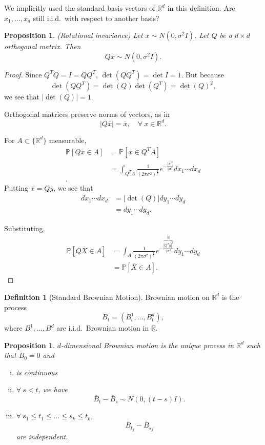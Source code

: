 \documentclass{tufte-handout}
\newcommand*\R{\mathbb{R}}
\renewcommand*\P{\mathbb{P}}
\newtheorem{prop}[thm]{Proposition}
\theoremstyle{definition}
\newtheorem{defn}[thm]{Definition}
\begin{document}
We implicitly used the standard basis vectors of $\R^d$ in this definition. Are $x_1,\ldots,x_d$ still i.i.d.\ with respect to another basis?

\begin{prop}
	(Rotational invariance) Let $\overline{x} \sim N(0, \sigma^2 I)$. Let $Q $ be a $d\times d$ orthogonal matrix. Then \[
		Qx \sim  N(0,\sigma^2 I)
	.\] 
\end{prop}
\begin{proof}
	Since $Q^TQ = I = Q Q^T$, $\det(Q Q^T) = \det I = 1$. But because \[
		\det(Q Q^T) = \det(Q) \det(Q^T) = \det(Q)^2
	,\] we see that $\left| \det(Q) \right| = 1$.

	Orthogonal matrices preserve norms of vectors, as in \[
		\left| Q\overline{x} \right| = \overline{x}, \quad \forall\ x \in \R^d
	.\] 

	For $A \subset \{ \R^d\}$ measurable,
	\begin{align*}
		\P\left[Q\overline{x} \in A\right] &= \P\left[\overline{x} \in Q^T A\right]  \\
										   &= \int_{Q^T A}^{} \frac{1}{\left( 2\pi\sigma^2 \right)^{\frac{d}{2}} }e^{- \frac{\left| \overline{x} \right|^2}{2\sigma^2}} dx_1\cdots dx_d \\
	.\end{align*}
	Putting $\overline{x} = Q\overline{y}$, we see that 
	\begin{align*}
		dx_1\cdots dx_d &= \left| \det(Q) \right|dy_1\cdots dy_d \\
						&= dy_1\cdots dy_d
	.\end{align*} 

	Substituting, \begin{align*}
		\P\left[Q\overline{X} \in A\right] &= \int_{A}^{} \frac{1}{\left( 2\pi\sigma^2 \right)^{\frac{d}{2}}}e^{- \frac{\overbrace{\left| Q^T \overline{y} \right|^2}^{\left| \overline{y} \right|}}{2\sigma^2}}dy_1\cdots dy_d  \\ 
										   &= \P\left[\overline{X} \in A\right] 
									   .\end{align*}
\end{proof}

\begin{defn}[Standard Brownian Motion]
	Brownian motion on $\R^d$ is the process \[
		\overline{B}_t = \left( B_t^1 , \ldots, B_t^d \right)
	,\] where $B^1,\ldots, B^d$ are i.i.d.\ Brownian motion in $\R$.
\end{defn}

\begin{prop}
	$d$-dimensional Brownian motion is the unique process in $\R^d$ such that $\overline{B}_0 = 0$ and
	\begin{enumerate}[(i)]
		\item is continuous 
		\item $\forall\ s < t$, we have \[
			\overline{B}_t - \overline{B}_s \sim  N\left( 0,(t-s)I \right)
		.\] 
		\item $\forall\ s_1\le t_1 \le \ldots\le s_k \le t_k$, \[
			\overline{B}_{t_j} - \overline{B}_{s_j}
		\] are independent.
	\end{enumerate}
\end{prop}
\end{document}
